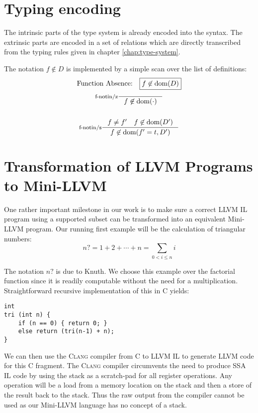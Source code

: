 \documentclass[a4paper, oneside, 10pt, draft]{memoir}
\newcommand{\clang}{\textsc{Clang}}
\begin{document}
\section{Typing encoding}

The intrinsic parts of the type system is already encoded into the
syntax. The extrinsic parts are encoded in a set of relations which are
directly transcribed from the typing rules given in chapter
\ref{chap:type-system}.

The notation $f \not \in D$ is implemented by a simple scan over the
list of definitions:
\begin{gather*}
  \text{Function Absence:} \quad \boxed{f \not \in \dom{D}}\\
  \inference[f-notin/z]{}{f \not \in \dom{\cdot}}\\\\
  \inference[f-notin/s]{f \neq f' \quad f \not \in \dom{D'}}{f \not \in \dom{f' = t, D'}}
\end{gather*}
\section{Transformation of LLVM Programs to Mini-LLVM}

One rather important milestone in our work is to make sure a correct
LLVM IL program using a supported subset can be transformed into an
equivalent Mini-LLVM program. Our running first example will be the
calculation of triangular numbers:
\begin{equation}
  \label{eq:1}
  n? = 1 + 2 + \dotsb + n = \sum_{0 < i \leq n} i
\end{equation}

The notation $n?$ is due to Knuth\cite[section
1.2.5]{knuth:1997:taocp1}. We choose this example over the factorial
function since it is readily computable without the need for a
multiplication. Straightforward recursive implementation of
this in C yields:
\begin{verbatim}
int
tri (int n) {
    if (n == 0) { return 0; }
    else return (tri(n-1) + n);
}
\end{verbatim}
We can then use the \clang{} compiler from C to LLVM IL to generate
LLVM code for this C fragment. The \clang{} compiler circumvents the
need to produce SSA IL code by using the stack as a scratch-pad for
all register operations. Any operation will be a load from a memory
location on the stack and then a store of the result back to the
stack. Thus the raw output from the compiler cannot be used as our
Mini-LLVM language has no concept of a stack.
\end{document}
